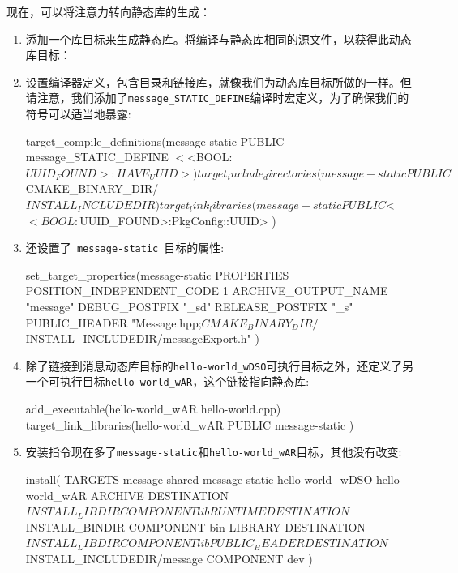 现在，可以将注意力转向静态库的生成：

\begin{enumerate}
\item 添加一个库目标来生成静态库。将编译与静态库相同的源文件，以获得此动态库目标：


\item 设置编译器定义，包含目录和链接库，就像我们为动态库目标所做的一样。但请注意，我们添加了\texttt{message\_STATIC\_DEFINE}编译时宏定义，为了确保我们的符号可以适当地暴露:

\begin{codebox}[cmake]
target_compile_definitions(message-static
  PUBLIC
    message_STATIC_DEFINE
    $<$<BOOL:${UUID_FOUND}>:HAVE_UUID>
  )
target_include_directories(message-static
    PUBLIC
    ${CMAKE_BINARY_DIR}/${INSTALL_INCLUDEDIR}
  )
target_link_libraries(message-static
  PUBLIC
    $<$<BOOL:${UUID_FOUND}>:PkgConfig::UUID>
  )
\end{codebox}

\item 还设置了\texttt{ message-static }目标的属性:

\begin{codebox}[cmake]
set_target_properties(message-static
  PROPERTIES
    POSITION_INDEPENDENT_CODE 1
    ARCHIVE_OUTPUT_NAME "message"
    DEBUG_POSTFIX "_sd"
    RELEASE_POSTFIX "_s"
    PUBLIC_HEADER "Message.hpp;${CMAKE_BINARY_DIR}/${INSTALL_INCLUDEDIR}/messageExport.h"
  )
\end{codebox}

\item 除了链接到消息动态库目标的\texttt{hello-world\_wDSO}可执行目标之外，还定义了另一个可执行目标\texttt{hello-world\_wAR}，这个链接指向静态库:

\begin{codebox}[cmake]
add_executable(hello-world_wAR hello-world.cpp)
target_link_libraries(hello-world_wAR
    PUBLIC
        message-static
    )
\end{codebox}

\item 安装指令现在多了\texttt{message-static}和\texttt{hello-world\_wAR}目标，其他没有改变:

\begin{codebox}[cmake]
install(
  TARGETS
    message-shared
    message-static
    hello-world_wDSO
    hello-world_wAR
  ARCHIVE
    DESTINATION ${INSTALL_LIBDIR}
    COMPONENT lib
  RUNTIME
    DESTINATION ${INSTALL_BINDIR}
    COMPONENT bin
  LIBRARY
    DESTINATION ${INSTALL_LIBDIR}
    COMPONENT lib
  PUBLIC_HEADER
    DESTINATION ${INSTALL_INCLUDEDIR}/message
    COMPONENT dev
  )
\end{codebox}

\end{enumerate}

